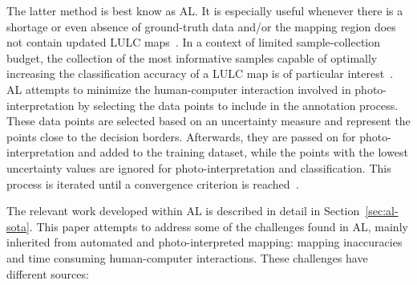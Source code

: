 \documentclass[parskip=full]{scrartcl}
\begin{document}
The latter method is best know as AL\@. It is especially useful whenever there
is a shortage or even absence of ground-truth data and/or the mapping region
does not contain updated LULC maps~\cite{Su2020}. In a context of limited
sample-collection budget, the collection of the most informative samples
capable of optimally increasing the classification accuracy of a LULC map is
of particular interest~\cite{Su2020}. AL attempts to minimize the
human-computer interaction involved in photo-interpretation by selecting the
data points to include in the annotation process. These data points are
selected based on an uncertainty measure and represent the points close to the
decision borders. Afterwards, they are passed on for photo-interpretation and
added to the training dataset, while the points with the lowest uncertainty
values are ignored for photo-interpretation and classification. This process
is iterated until a convergence criterion is reached~\cite{Pasolli2016}. 

The relevant work developed within AL is described in detail in
Section~\ref{sec:al-sota}. This paper attempts to address some of the
challenges found in AL, mainly inherited from automated and photo-interpreted
mapping: mapping inaccuracies and time consuming human-computer interactions.
These challenges have different sources:
\end{document}
